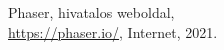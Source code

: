 \begin{thebibliography}{x}
	
	
	
	
	
	
	
	
	
	
	
	
	
	
	
	
	
	
	
	
	
	
	
	
	
	
	
	
	
	
	
	
	
	
	
	
	
	
	
	
	
	Phaser, hivatalos weboldal, \\
	\url{https://phaser.io/},
	Internet, 2021.


\end{thebibliography}

